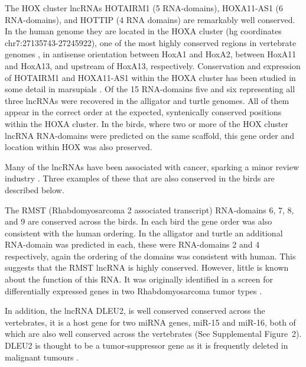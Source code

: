 \documentclass[10pt]{bmc_article}
\newenvironment{bmcformat}{\begin{raggedright}\baselineskip20pt\sloppy\setboolean{publ}{false}}{\end{raggedright}\baselineskip20pt\sloppy}
\begin{document}
\begin{bmcformat}
The HOX cluster lncRNAs HOTAIRM1 (5 RNA-domains), HOXA11-AS1 (6
RNA-domains), and HOTTIP (4 RNA domains) are remarkably well conserved. In
the human genome they are located in the HOXA cluster (hg coordinates
chr7:27135743-27245922), one of the most highly conserved regions in
vertebrate genomes \cite{PascualAnaya:13}, in antisense orientation between
HoxA1 and HoxA2, between HoxA11 and HoxA13, and upstream of HoxA13,
respectively. Conservation and expression of HOTAIRM1 and HOXA11-AS1 within
the HOXA cluster has been studied in some detail in marsupials
\cite{Yu:12}.  Of the 15 RNA-domains five and six representing all three
lncRNAs were recovered in the alligator and turtle genomes. All of them
appear in the correct order at the expected, syntenically conserved
positions within the HOXA cluster.  In the birds, where two or more of the
HOX cluster lncRNA RNA-domains were predicted on the same scaffold, this
gene order and location within HOX was also preserved.


Many of the lncRNAs have been associated with cancer, sparking a minor
review industry \cite{Prensner:2011,Spizzo:2012}. Three examples of
these that are also conserved in the birds are described below.

The RMST (Rhabdomyosarcoma 2 associated transcript) RNA-domains 6, 7,
8, and 9 are conserved across the birds. In each bird the gene order
was also consistent with the human ordering. In the alligator and
turtle an additional RNA-domain was predicted in each, these were
RNA-domains 2 and 4 respectively, again the ordering of the domains
was consistent with human. This suggests that the RMST lncRNA is
highly conserved. However, little is known about the function of this
RNA. It was originally identified in a screen for differentially
expressed genes in two Rhabdomyosarcoma tumor types \cite{Chan:2002}.

In addition, the lncRNA DLEU2, is well conserved conserved across the
vertebrates, it is a host gene for two miRNA genes, miR-15 and miR-16,
both of which are also well conserved across the vertebrates (See
Supplemental Figure~2). DLEU2 is thought to be a tumor-suppressor gene
as it is frequently deleted in malignant tumours
\cite{Lerner:2009,Klein:2010}.


\end{bmcformat}
\end{document}
